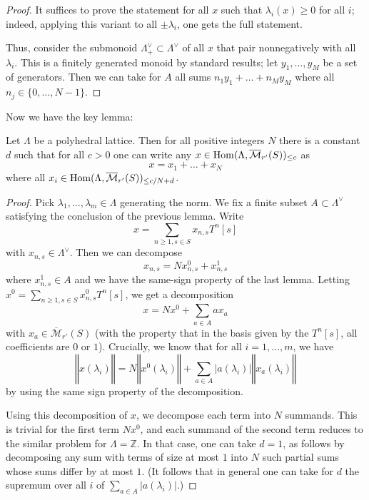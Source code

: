 \begin{proof}
  It suffices to prove the statement for all $x$ such that $\lambda_i(x)\geq 0$ for all $i$;
  indeed, applying this variant to all $\pm \lambda_i$, one gets the full statement.

  Thus, consider the submonoid $\Lambda^\vee_+\subset \Lambda^\vee$
  of all $x$ that pair nonnegatively with all $\lambda_i$.
  This is a finitely generated monoid by standard results;
  let $y_1,\ldots,y_M$ be a set of generators.
  Then we can take for $A$ all sums $n_1y_1+\ldots+n_My_M$ where all $n_j\in \{0,\ldots,N-1\}$.
\end{proof}

Now we have the key lemma:

\begin{lemma}
  \label{combi}
  \leanok
  Let $\Lambda$ be a polyhedral lattice.
  Then for all positive integers $N$ there is a constant $d$
  such that for all $c>0$ one can write any
  $x\in \operatorname{Hom}(\Lambda,\overline{\mathcal M}_{r'}(S))_{\leq c}$ as
  \[
    x=x_1+\ldots+x_N
  \]
  where all $x_i\in \operatorname{Hom}(\Lambda,\overline{\mathcal M}_{r'}(S))_{\leq c/N+d}$.
\end{lemma}

\begin{proof}
  Pick $\lambda_1,\ldots,\lambda_m\in \Lambda$ generating the norm. We fix a finite subset $A\subset \Lambda^\vee$ satisfying the conclusion of the previous lemma. Write
  \[
  x=\sum_{n\geq 1, s\in S} x_{n,s} T^n [s]
  \]
  with $x_{n,s}\in \Lambda^\vee$. Then we can decompose
  \[
  x_{n,s} = N x_{n,s}^0 + x_{n,s}^1
  \]
  where $x_{n,s}^1\in A$ and we have the same-sign property of the last lemma. Letting $x^0 = \sum_{n\geq 1, s\in S} x_{n,s}^0 T^n [s]$, we get a decomposition
  \[
  x = Nx^0 + \sum_{a\in A} a x_a
  \]
  with $x_a\in \overline{\mathcal M}_{r'}(S)$ (with the property that in the
  basis given by the $T^n [s]$, all coefficients are $0$ or $1$). Crucially,
  we know that for all $i=1,\ldots,m$, we have
  \[
  ‖x(\lambda_i)‖ = N ‖x^0(\lambda_i)‖ + \sum_{a\in A} |a(\lambda_i)| ‖x_a(\lambda_i)‖
  \]
  by using the same sign property of the decomposition.

  Using this decomposition of $x$, we decompose each term into $N$ summands.
  This is trivial for the first term $Nx^0$,
  and each summand of the second term reduces to the similar problem for $\Lambda=\mathbb Z$.
  In that case, one can take $d=1$,
  as follows by decomposing any sum with terms of size at most $1$
  into $N$ such partial sums whose sums differ by at most $1$.
  (It follows that in general one can take for $d$
  the supremum over all $i$ of $\sum_{a\in A} |a(\lambda_i)|$.)
\end{proof}




